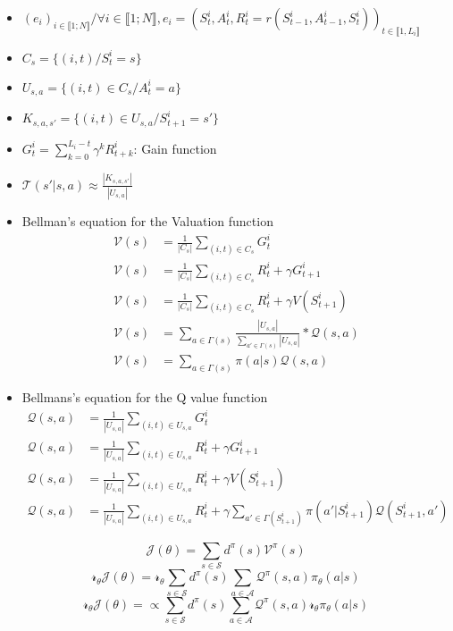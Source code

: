 \documentclass[8pt,a4paper]{extarticle}
\begin{document}
\begin{itemize}

\item
  $(e_i)_{i \in \llbracket 1; N \rrbracket} / \forall i \in \llbracket 1; N \rrbracket, e_i = (S_t^i, A^i_t, R^i_t = r(S_{t-1}^i, A_{t-1}^i, S_t^i))_{t \in \llbracket 1, L_i \rrbracket}$

\item $C_s = \{(i, t)/ S^i_t = s\}$
\item
  $U_{s, a}= \{ (i, t) \in C_s / A_t^i = a\}$
\item
  $K_{s, a , s'}= \{(i, t) \in U_{s, a} / S_{t+1}^i = s'\}$
\item
  $G_t^i = \sum_{k=0}^{L_i - t}\gamma^k R^i_{t+k}$: Gain function
\item
  $\mathcal T(s' | s, a) \approx \frac{|K_{s, a, s'}|}{|U_{s, a}|}$

\item
  Bellman's equation for the Valuation function
  \begin{align}
    \mathcal V(s) &= \frac{1}{|C_s|}\sum_{(i, t) \in C_s}G^i_t \\
    \mathcal V(s) &= \frac{1}{|C_s|}\sum_{(i, t) \in C_s} R^i_t + \gamma G^i_{t+1}  \\
    \mathcal V(s) &= \frac{1}{|C_s|}\sum_{(i, t) \in C_s} R^i_t + \gamma V(S_{t+1}^i) \\
    \mathcal V(s) &= \sum_{a\in \Gamma(s)}\frac{|U_{s, a}|}{\sum_{a'\in \Gamma(s)}|U_{s, a}|}*\mathcal Q(s, a) \\
    \mathcal V(s) &= \sum_{a\in \Gamma(s)} \pi(a | s)\mathcal Q(s, a)
  \end{align}

\item
  Bellmans's equation for the Q value function
  \begin{align}
    \mathcal Q(s, a) &= \frac{1}{|U_{s, a}|}\sum_{(i, t) \in U_{s,
        a}}G^i_t \\ \mathcal Q(s, a) &= \frac{1}{|U_{s, a}|}\sum_{(i,
      t) \in U_{s, a}}R^i_t + \gamma G^i_{t+1} \\ \mathcal Q(s, a) &=
    \frac{1}{|U_{s, a}|}\sum_{(i, t) \in U_{s, a}}R^i_t + \gamma
    V(S_{t+1}^i) \\ \mathcal Q(s, a) &= \frac{1}{|U_{s, a}|}\sum_{(i,
      t) \in U_{s, a}}R^i_t + \gamma \sum_{a'\in \Gamma(S_{t+1}^i)}
    \pi(a' | S_{t+1}^i)\mathcal Q(S_{t+1}^i, a')
  \end{align}
  
\end{itemize}


\[\mathcal J(\theta) = \sum_{s\in \mathcal S}d^{\pi}(s)\mathcal V^{\pi}(s) \]
\[ \mathcal r_{\theta} \mathcal J(\theta) = \mathcal r_{\theta} \sum_{s\in \mathcal S}d^{\pi}(s)\sum_{a \in \mathcal A}\mathcal Q^{\pi}(s,a)\pi_{\theta}(a|s)\]
\[ \mathcal r_{\theta} \mathcal J(\theta) = \propto \sum_{s\in \mathcal S}d^{\pi}(s)\sum_{a \in \mathcal A}\mathcal Q^{\pi}(s,a)\mathcal r_{\theta}\pi_{\theta}(a|s)\]
\end{document}
